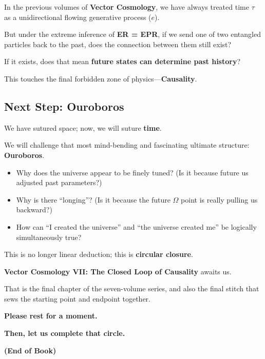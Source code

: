 In the previous volumes of \textbf{Vector Cosmology}, we have always treated time $\tau$ as a unidirectional flowing generative process ($e$).

But under the extreme inference of \textbf{ER = EPR}, if we send one of two entangled particles back to the past, does the connection between them still exist?

If it exists, does that mean \textbf{future states can determine past history}?

This touches the final forbidden zone of physics---\textbf{Causality}.

\subsection{Next Step: Ouroboros}

We have sutured space; now, we will suture \textbf{time}.

We will challenge that most mind-bending and fascinating ultimate structure: \textbf{Ouroboros}.

\begin{itemize}
\item Why does the universe appear to be finely tuned? (Is it because future us adjusted past parameters?)

\item Why is there ``longing''? (Is it because the future $\Omega$ point is really pulling us backward?)

\item How can ``I created the universe'' and ``the universe created me'' be logically simultaneously true?
\end{itemize}

This is no longer linear deduction; this is \textbf{circular closure}.

\textbf{Vector Cosmology VII: The Closed Loop of Causality} awaits us.

That is the final chapter of the seven-volume series, and also the final stitch that sews the starting point and endpoint together.

\textbf{Please rest for a moment.}

\textbf{Then, let us complete that circle.}

\textbf{(End of Book)}

